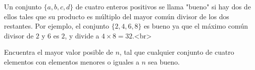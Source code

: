 Un conjunto $\{a, b, c, d\}$ de cuatro enteros positivos se llama "bueno" si hay dos de ellos tales que su producto es múltiplo del mayor común divisor de los dos restantes. Por ejemplo, el conjunto $\{2, 4, 6, 8\}$ es bueno ya que el máximo común divisor de $2$ y $6$ es $2$, y divide a $4\times 8=32$.<br>

Encuentra el mayor valor posible de $n$, tal que cualquier conjunto de cuatro elementos con elementos menores o iguales a $n$ sea bueno.
